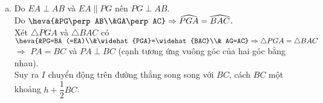 \begin{bt}
{{}
\begin{enumerate}[b)]
\item 
Do $EA\perp AB$ và $EA\parallel PG$ nên $PG\perp AB$.\\
Do $\heva{&PG\perp AB\\&GA\perp AC}\Rightarrow \widehat{PGA}=\widehat{BAC}$.\\
Xét $\triangle PGA$ và $\triangle BAC$ có\\
$\heva{&PG=BA (=EA)\\&\widehat{PGA}=\widehat{BAC}\\& AG=AC}\Rightarrow \triangle PGA =\triangle BAC$\\ $\Rightarrow$ $PA=BC$ và $PA\perp BC$ (cạnh tương ứng vuông góc của hai góc bằng nhau).\\ Suy ra $I$ chuyển động trên đường thẳng song song với $BC$, cách $BC$ một khoảng $h+\dfrac{1}{2}BC$.
\end{enumerate}		

}
\end{bt}

